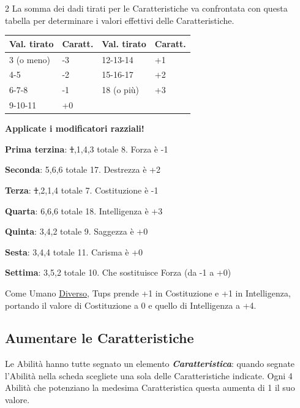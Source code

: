 \begin{multicols}{2}
La somma dei dadi tirati per le Caratteristiche va confrontata con questa tabella per determinare i valori effettivi delle Caratteristiche.

\medskip

\noindent\begin{tabularx}{\linewidth}{ll|ll}
\toprule
\rowcolor{gray!20}\textbf{Val. tirato} & \textbf{Caratt.} & \textbf{Val. tirato} & \textbf{Caratt.}\\
\toprule
3 (o meno)	&	-3	&	12-13-14	&	+1\\
\rowcolor{gray!20}4-5			&	-2	&	15-16-17	&	+2\\
6-7-8		&	-1	&	18 (o più)	&+3\\
\rowcolor{gray!20}9-10-11		&	+0	&	&\\
\end{tabularx}

\medskip

\textbf{Applicate i modificatori razziali!}

\medskip

\begin{giocatore}
		\textbf{Prima terzina}: \st{1},1,4,3 totale 8. Forza è -1

		\textbf{Seconda}: 5,6,6 totale 17. Destrezza è +2

		\textbf{Terza}: \st{1},2,1,4 totale 7. Costituzione è -1

		\textbf{Quarta}: 6,6,6 totale 18. Intelligenza è +3

		\textbf{Quinta}: 3,4,2 totale 9. Saggezza è +0

		\textbf{Sesta}: 3,4,4 totale 11. Carisma è +0

		\textbf{Settima}: 3,5,2 totale 10. Che sostituisce Forza (da -1 a +0)

		Come Umano \hyperlink{diverso}{Diverso}, Tups prende +1 in Costituzione e +1 in Intelligenza, portando il valore di Costituzione a 0 e quello di Intelligenza a +4.

\end{giocatore}

\subsection{Aumentare le Caratteristiche}\label{aumentarelecaratteristiche}\hypertarget{aumentarelecaratteristiche}{}

Le Abilità hanno tutte segnato un elemento \emph{\textbf{Caratteristica}}: quando segnate l'Abilità nella scheda scegliete una sola delle Caratteristiche indicate. Ogni 4 Abilità che potenziano la medesima Caratteristica questa aumenta di 1 il suo valore.


\end{multicols}
